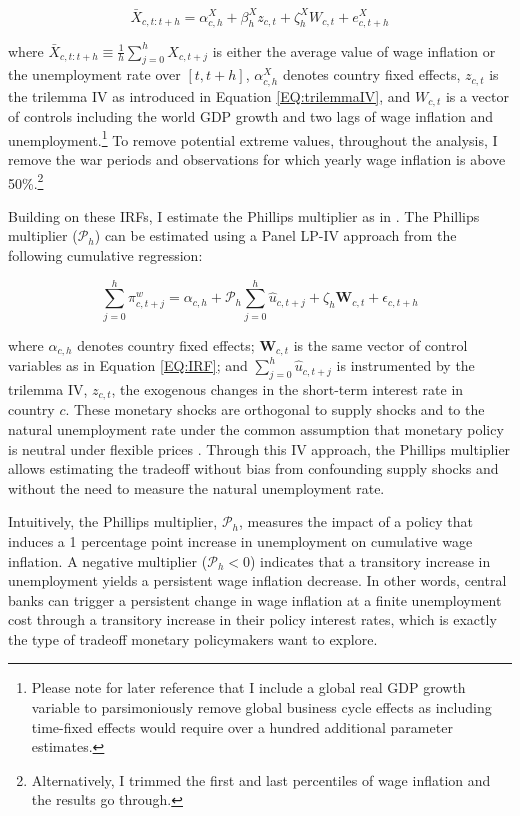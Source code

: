 \documentclass[12pt]{article}
\renewcommand{\vec}[1]{\mathbf{#1}}
\begin{document}
\begin{equation} \label{EQ:IRF}
	\bar{X}_{c,t:t+h} = \alpha^X_{c,h} + \beta_h^X z_{c,t} + \zeta^X_h W_{c,t} + e^X_{c,t+h}
\end{equation}

where $\bar{X}_{c,t:t+h} \equiv \frac{1}{h} \sum^h_{j=0} X_{c,t+j}$ is either the average value of wage inflation or the unemployment rate over $[t,t+h]$, $\alpha^X_{c,h}$ denotes country fixed effects, $z_{c,t}$ is the trilemma IV as introduced in Equation \eqref{EQ:trilemmaIV}, and $W_{c,t}$ is a vector of controls including the world GDP growth and two lags of wage inflation and unemployment.\footnote{Please note for later reference that I include a global real GDP growth variable to parsimoniously remove global business cycle effects as including time-fixed effects would require over a hundred additional parameter estimates.} To remove potential extreme values, throughout the analysis, I remove the war periods and observations for which yearly wage inflation is above 50\%.\footnote{Alternatively, I trimmed the first and last percentiles of wage inflation and the results go through.}

Building on these IRFs, I estimate the Phillips multiplier as in \cite{Barnichon2019}. The Phillips multiplier ($\mathcal{P}_h$) can be estimated using a Panel LP-IV approach from the following cumulative regression:

\begin{equation} \label{EQ:MULT}
	\sum_{j=0}^{h} \pi_{c,t+j}^{w} = \alpha_{c,h} + \mathcal{P}_h \sum_{j=0}^{h} \hat{u}_{c,t+j} + \zeta_h \vec{W}_{c,t} + \epsilon_{c,t+h}
\end{equation}

where $\alpha_{c,h}$ denotes country fixed effects; $\vec{W}_{c,t}$ is the same vector of control variables as in Equation \eqref{EQ:IRF}; and $\sum_{j=0}^{h} \hat{u}_{c,t+j}$ is instrumented by the trilemma IV, $z_{c,t}$, the exogenous changes in the short-term interest rate in country $c$. These monetary shocks are orthogonal to supply shocks and to the natural unemployment rate under the common assumption that monetary policy is neutral under flexible prices \citep{Gali2015}. Through this IV approach, the Phillips multiplier allows estimating the tradeoff without bias from confounding supply shocks and without the need to measure the natural unemployment rate.

Intuitively, the Phillips multiplier, $\mathcal{P}_h$, measures the impact of a policy that induces a 1 percentage point increase in unemployment on cumulative wage inflation. A negative multiplier ($\mathcal{P}_h < 0$) indicates that a transitory increase in unemployment yields a persistent wage inflation decrease. In other words, central banks can trigger a persistent change in wage inflation at a finite unemployment cost through a transitory increase in their policy interest rates, which is exactly the type of tradeoff monetary policymakers want to explore.
\end{document}

